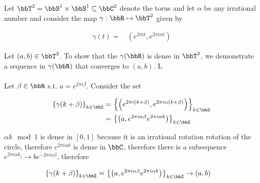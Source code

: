 Let $\bbT^2=\bbS^1\times\bbS^1\subseteq\bbC^2$ denote the torus and let $\alpha$ be any irrational number and consider the map $\gamma:\bbR\mapsto\bbT^2$ given by

\begin{align*}
	\gamma(t) = & \, \left(e^{2\pi i t}, e^{2 \pi i \alpha t}\right)
\end{align*}

Let $(a,b) \in \bbT^2$. To show that the $\gamma(\bbR)$ is dense in $\bbT^2$, we demonstrate a sequence in $\gamma(\bbR)$ that converges to $(a,b)$. L
\\\\
Let $\beta \in \bbR$ s.t. $a = e^{2\pi i \beta}$. Consider the set 

\begin{align*}
	\left\{\gamma(k+\beta)\right\}_{k \in \bbZ}
		= & \, 
	\left\{\left(e^{2\pi i (k+\beta)}, e^{2 \pi i \alpha (k+\beta)}\right)\right\}_{k \in \bbZ}
\\
		= & \,
	\left\{\left(a, e^{2 \pi i \alpha \beta}e^{2 \pi i \alpha k}\right)\right\}_{k \in \bbZ}
\end{align*}

$\alpha k \mod 1$ is dense in $[0, 1]$ because it is an irrational rotation rotation of the circle, therefore $e^{2 \pi i \alpha k}$ is dense in $\bbC$, therefore there is a subsequence $e^{2 \pi i \alpha k_j} \to b  e^{-2 \pi i \alpha \beta}$, therefore 

\begin{align*}
	\left\{\gamma(k+\beta)\right\}_{k \in \bbZ}
		= & \,
	\left\{\left(a, e^{2 \pi i \alpha \beta}e^{2 \pi i \alpha k}\right)\right\}_{k \in \bbZ}
	\to (a, b)
\end{align*}


